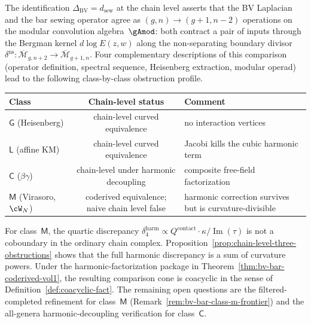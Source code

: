 \begin{remark}%
\label{rem:bv-sewing-chain-level-classes-vol1}%
%
%
%
The identification $\Delta_{\mathrm{BV}} = d_{\mathrm{sew}}$ at
the chain level asserts that the BV Laplacian and the bar sewing
operator agree as $(g,n) \to (g{+}1,n{-}2)$ operations on the
modular convolution algebra~$\gAmod$: both contract a pair of
inputs through the Bergman kernel $d\log E(z,w)$ along the
non-separating boundary divisor
$\delta^{\mathrm{ns}}\colon
\overline{\mathcal{M}}_{g,n+2} \to
\overline{\mathcal{M}}_{g+1,n}$.
Four complementary descriptions of this comparison
\textup{(}operator definition, spectral sequence, Heisenberg
extraction, modular operad\textup{)} lead to the following
class-by-class obstruction profile.
\begin{center}
\small
\renewcommand{\arraystretch}{1.15}
\begin{tabular}{lcl}
\toprule
Class & Chain-level status & Comment \\
\midrule
$\mathsf{G}$ \textup{(}Heisenberg\textup{)}
 & chain-level curved equivalence & no interaction vertices \\
$\mathsf{L}$ \textup{(}affine KM\textup{)}
 & chain-level curved equivalence & Jacobi kills the cubic harmonic term \\
$\mathsf{C}$ \textup{(}$\beta\gamma$\textup{)}
 & chain-level under harmonic decoupling & composite free-field factorization \\
$\mathsf{M}$ \textup{(}Virasoro, $\cW_N$\textup{)}
 & coderived equivalence; naive chain level false & harmonic correction survives but is curvature-divisible \\
\bottomrule
\end{tabular}
\end{center}
For class~$\mathsf{M}$, the quartic discrepancy
$\delta_4^{\mathrm{harm}} \propto Q^{\mathrm{contact}} \cdot
\kappa / \operatorname{Im}(\tau)$ is not a coboundary
in the ordinary chain complex. Proposition~\ref{prop:chain-level-three-obstructions}
shows that the full harmonic discrepancy is a sum of curvature
powers. Under the harmonic-factorization package in
Theorem~\ref{thm:bv-bar-coderived-vol1}, the resulting comparison
cone is coacyclic in the sense of
Definition~\ref{def:coacyclic-fact}. The remaining open questions are
the filtered-completed refinement for class~$\mathsf{M}$
\textup{(}Remark~\ref{rem:bv-bar-class-m-frontier}\textup{)} and the
all-genera harmonic-decoupling verification for class~$\mathsf{C}$.
\end{remark}

